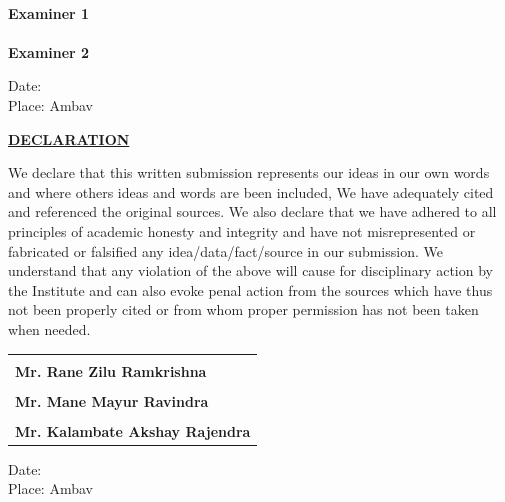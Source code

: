 \documentclass[a4paper,12pt]{report}
\begin{document}
\begin{flushright}
\vspace{10mm}
\underline{\hspace{50mm}}\\
{\bf {Examiner 1}\\
\vspace{15mm}
\underline{\hspace{50mm}}\\
{\bf {Examiner 2}}}
\end{flushright}
\vfill
\begin{flushleft}
Date:\\
Place: Ambav\\
\end{flushleft}
\newpage
\thisfancypage{%
\setlength{\fboxsep}{12pt}\doublebox}{}
\begin{center}
{\huge \bf \underline{DECLARATION}}
\end{center}
\vspace{10mm}
\hspace{12mm}We declare that this written submission represents our ideas in our own words and where others ideas and words are been included, We have adequately cited and referenced the original sources. We also declare that we have adhered to all principles of academic honesty and integrity and have not misrepresented or fabricated or falsified any idea/data/fact/source in our submission. We understand that any violation of the above will cause for disciplinary action by the Institute and can also evoke penal action from the sources which have thus not been properly cited or from whom proper permission has not been taken when needed.\\
\begin{flushright}
\begin{tabular}{p{60mm}}
\vspace{10mm}
\underline{\hspace{60mm}}\\
{\bf {Mr. Rane Zilu Ramkrishna}}\\
\vspace{10mm}
\underline{\hspace{60mm}}\\
{\bf {Mr. Mane Mayur Ravindra}}\\
\vspace{10mm}
\underline{\hspace{60mm}}\\
{\bf {Mr. Kalambate Akshay Rajendra}}
\end{tabular}
\end{flushright}
\vfill
\begin{flushleft}
Date:\\
Place: Ambav\\
\end{flushleft}
\end{document}
